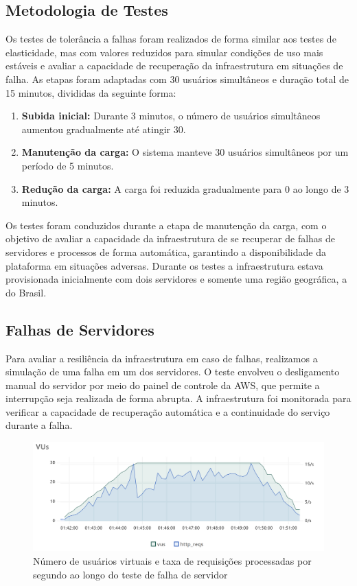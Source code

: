 \subsection{Metodologia de Testes}

Os testes de tolerância a falhas foram realizados de forma similar aos testes de elasticidade, mas com valores reduzidos para simular condições de uso mais estáveis e avaliar a capacidade de recuperação da infraestrutura em situações de falha. As etapas foram adaptadas com 30 usuários simultâneos e duração total de 15 minutos, divididas da seguinte forma:

\begin{enumerate}
    \item \textbf{Subida inicial:} Durante 3 minutos, o número de usuários simultâneos aumentou gradualmente até atingir 30.
    \item \textbf{Manutenção da carga:} O sistema manteve 30 usuários simultâneos por um período de 5 minutos.
    \item \textbf{Redução da carga:} A carga foi reduzida gradualmente para 0 ao longo de 3 minutos.
\end{enumerate}

Os testes foram conduzidos durante a etapa de manutenção da carga, com o objetivo de avaliar a capacidade da infraestrutura de se recuperar de falhas de servidores e processos de forma automática, garantindo a disponibilidade da plataforma em situações adversas. Durante os testes a infraestrutura estava provisionada inicialmente com dois servidores e somente uma região geográfica, a do Brasil.

\subsection{Falhas de Servidores}


Para avaliar a resiliência da infraestrutura em caso de falhas, realizamos a simulação de uma falha em um dos servidores. O teste envolveu o desligamento manual do servidor por meio do painel de controle da AWS, que permite a interrupção seja realizada de forma abrupta. A infraestrutura foi monitorada para verificar a capacidade de recuperação automática e a continuidade do serviço durante a falha.

\begin{figure}[H]
    \centering
    \includegraphics[width=1\textwidth]{assets/server-failing-test/vus-and-reqs.png}
    \caption{Número de usuários virtuais e taxa de requisições processadas por segundo ao longo do teste de falha de servidor}
    \label{fig:server-failing-vus-and-reqs}
\end{figure}

